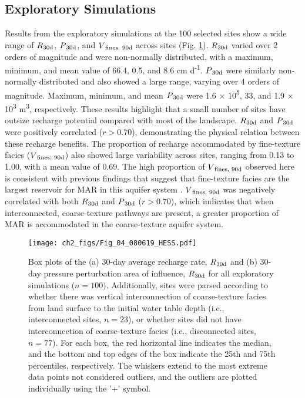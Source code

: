 \subsection{Exploratory Simulations} \label{ssec:R_exploratory_sims}
Results from the exploratory simulations at the 100 selected sites show a wide range of $R\textsubscript{30d}$, $P\textsubscript{30d}$, and $V\textsubscript{fines, 90d}$ across sites (Fig. \ref{fig:box_plots}). $R\textsubscript{30d}$ varied over 2 orders of magnitude and were non-normally distributed, with a maximum, minimum, and mean value of 66.4, 0.5, and 8.6 cm d\textsuperscript{-1}. $P\textsubscript{30d}$ were similarly non-normally distributed and also showed a large range, varying over 4 orders of magnitude. Maximum, minimum, and mean $P\textsubscript{30d}$ were 1.6 $\times$ 10\textsuperscript{5}, 33, and 1.9 $\times$ 10\textsuperscript{3} m\textsuperscript{3}, respectively. These results highlight that a small number of sites have outsize recharge potential compared with most of the landscape. $R\textsubscript{30d}$ and $P\textsubscript{30d}$ were positively correlated ($r > 0.70$), demonstrating the physical relation between these recharge benefits. The proportion of recharge accommodated by fine-texture facies ($V\textsubscript{fines, 90d}$) also showed large variability across sites, ranging from 0.13 to 1.00, with a mean value of 0.69. The high proportion of $V\textsubscript{fines, 90d}$ observed here is consistent with previous findings that suggest that fine-texture facies are the largest reservoir for MAR in this aquifer system \citep{maples_2019}. $V\textsubscript{fines, 90d}$ was negatively correlated with both $R\textsubscript{30d}$ and $P\textsubscript{30d}$ ($r > 0.70$), which indicates that when interconnected, coarse-texture pathways are present, a greater proportion of MAR is accommodated in the coarse-texture aquifer system.

\begin{figure}[ht!]
\centering
\texttt{[image: ch2\_figs/Fig\_04\_080619\_HESS.pdf]}
\caption{Box plots of the (a) 30-day average recharge rate, $R\textsubscript{30d}$ and (b) 30-day pressure perturbation area of influence, $R\textsubscript{30d}$ for all exploratory simulations ($n = 100)$. Additionally, sites were parsed according to whether there was vertical interconnection of coarse-texture facies from land surface to the initial water table depth (i.e., interconnected sites, $n = 23$), or whether sites did not have interconnection of coarse-texture facies (i.e., disconnected sites, $n = 77$). For each box, the red horizontal line indicates the median, and the bottom and top edges of the box indicate the 25th and 75th percentiles, respectively. The whiskers extend to the most extreme data points not considered outliers, and the outliers are plotted individually using the '+' symbol.}
\label{fig:box_plots}
\end{figure}

